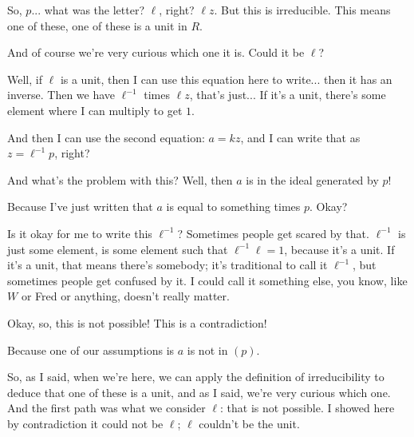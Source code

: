 \begin{proofWrapper}
\begin{speech}[00:50:50 - 00:52:42]
So, $p$... what was the letter? $\ell$, right? $\ell z$.  But this is irreducible. This means one of these,  one of these is a unit in $R$.

And of course we're very curious which one it is. Could it be $\ell$? 

Well, if $\ell$ is a unit,  then I can use this equation here to write... then it has an inverse. Then we have $\ell^{-1}$ times $\ell z$, that's just...  If it's a unit, there's some element where I can multiply to get $1$.

And then I can use the second equation: $a = kz$, and I can write that as $z = \ell^{-1} p$, right? 

And what's the problem with this? Well, then $a$ is in the ideal generated by $p$! 

Because I've just written that $a$ is equal to something times $p$.  Okay?
\end{speech}

\begin{speech}[00:52:42 - 00:54:02]
Is it okay for me to write this $\ell^{-1}$? Sometimes people get scared by that. $\ell^{-1}$ is just some element, is some element such that  $\ell^{-1} \ell = 1$, because it's a unit. If it's a unit, that means there's somebody; it's traditional to call it $\ell^{-1}$, but sometimes people get confused by it. I could call it something else, you know, like $W$ or Fred or anything, doesn't really matter.

Okay, so, this is not possible! This is a contradiction! 

Because one of our assumptions is $a$ is not in $(p)$. 

So, as I said, when we're here, we can apply the definition of irreducibility to deduce that one of these is a unit, and as I said, we're very curious which one. And the first path was what we consider $\ell$: that is not possible. I showed here by contradiction it could not be $\ell$; $\ell$ couldn't be the unit.
\end{speech}


\end{proofWrapper}
